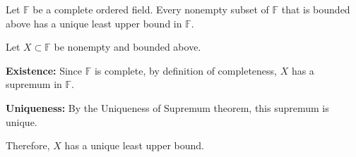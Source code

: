 \begin{theorem}\label{th:lub-principle}
Let $\mathbb{F}$ be a complete ordered field. Every nonempty subset of $\mathbb{F}$ that is bounded above has a unique least upper bound in $\mathbb{F}$.
\end{theorem}

\begin{bookproof}
Let $X \subset \mathbb{F}$ be nonempty and bounded above.

\textbf{Existence:} Since $\mathbb{F}$ is complete, by definition of completeness, $X$ has a supremum in $\mathbb{F}$.

\textbf{Uniqueness:} By the Uniqueness of Supremum theorem, this supremum is unique.

Therefore, $X$ has a unique least upper bound.
\end{bookproof}

